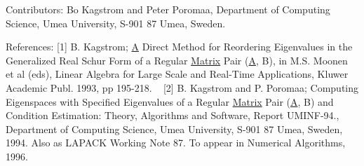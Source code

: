 \begin{DoxyParagraph}{Contributors\+: }
Bo Kagstrom and Peter Poromaa, Department of Computing Science, Umea University, S-\/901 87 Umea, Sweden. 
\end{DoxyParagraph}
\begin{DoxyParagraph}{References\+: }
\mbox{[}1\mbox{]} B. Kagstrom; \hyperlink{classA}{A} Direct Method for Reordering Eigenvalues in the Generalized Real Schur Form of a Regular \hyperlink{classMatrix}{Matrix} Pair (\hyperlink{classA}{A}, B), in M.\+S. Moonen et al (eds), Linear Algebra for Large Scale and Real-\/\+Time Applications, Kluwer Academic Publ. 1993, pp 195-\/218. ~\newline
 \mbox{[}2\mbox{]} B. Kagstrom and P. Poromaa; Computing Eigenspaces with Specified Eigenvalues of a Regular \hyperlink{classMatrix}{Matrix} Pair (\hyperlink{classA}{A}, B) and Condition Estimation\+: Theory, Algorithms and Software, Report U\+M\+I\+N\+F-\/94., Department of Computing Science, Umea University, S-\/901 87 Umea, Sweden, 1994. Also as L\+A\+P\+A\+C\+K Working Note 87. To appear in Numerical Algorithms, 1996. 
\end{DoxyParagraph}
